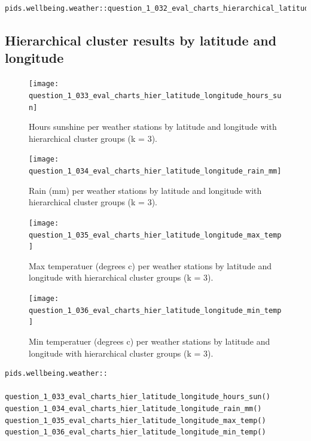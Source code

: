 \documentclass[12pt, oneside, openany]{book}
\begin{document}
\bigskip
\begin{lstlisting}
pids.wellbeing.weather::question_1_032_eval_charts_hierarchical_latitude()
\end{lstlisting}

\subsection*{Hierarchical cluster results by latitude and longitude}

\begin{figure}
	\centering
	\captionsetup{justification=centering}
	\texttt{[image: question\_1\_033\_eval\_charts\_hier\_latitude\_longitude\_hours\_sun]}
	\caption{Hours sunshine per weather stations by latitude and longitude with hierarchical cluster groups (k = 3).}
	\label{fig:question_1_033_eval_charts_hier_latitude_longitude_hours_sun}
\end{figure}

\begin{figure}
	\centering
	\captionsetup{justification=centering}
	\texttt{[image: question\_1\_034\_eval\_charts\_hier\_latitude\_longitude\_rain\_mm]}
	\caption{Rain (mm) per weather stations by latitude and longitude with hierarchical cluster groups (k = 3).}
	\label{fig:question_1_034_eval_charts_hier_latitude_longitude_rain_mm}
\end{figure}

\begin{figure}
	\centering
	\captionsetup{justification=centering}
	\texttt{[image: question\_1\_035\_eval\_charts\_hier\_latitude\_longitude\_max\_temp]}
	\caption{Max temperatuer (degrees c) per weather stations by latitude and longitude with hierarchical cluster groups (k = 3).}
	\label{fig:question_1_035_eval_charts_hier_latitude_longitude_max_temp}
\end{figure}

\begin{figure}
	\centering
	\captionsetup{justification=centering}
	\texttt{[image: question\_1\_036\_eval\_charts\_hier\_latitude\_longitude\_min\_temp]}
	\caption{Min temperatuer (degrees c) per weather stations by latitude and longitude with hierarchical cluster groups (k = 3).}
	\label{fig:question_1_036_eval_charts_hier_latitude_longitude_min_temp}
\end{figure}

\bigskip
\begin{lstlisting}
pids.wellbeing.weather::

question_1_033_eval_charts_hier_latitude_longitude_hours_sun()
question_1_034_eval_charts_hier_latitude_longitude_rain_mm()
question_1_035_eval_charts_hier_latitude_longitude_max_temp()
question_1_036_eval_charts_hier_latitude_longitude_min_temp()
\end{lstlisting}
\end{document}
